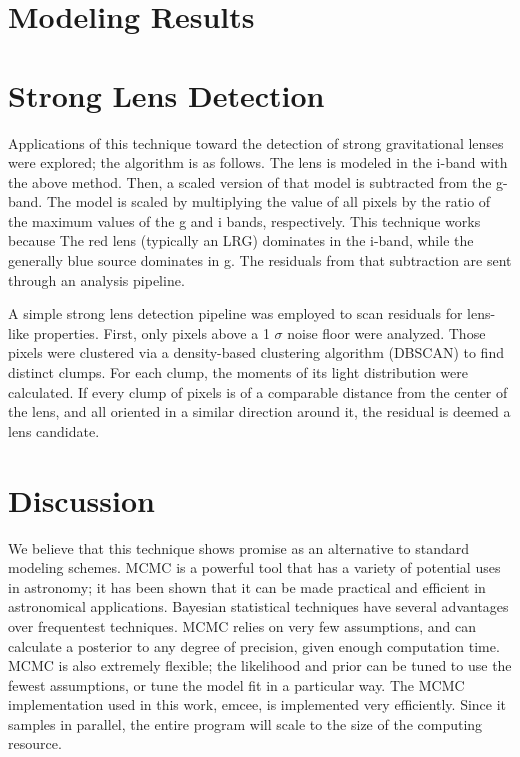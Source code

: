 \documentclass[authoryear, 12pt, 5p, times]{elsarticle}
\begin{document}
\section{Modeling Results}\label{results}

\section{Strong Lens Detection}\label{detection}
Applications of this technique toward the detection of strong gravitational lenses were explored; the algorithm is as follows. The lens is modeled in the i-band with the above method. Then, a scaled version of that model is subtracted from the g-band. The model is scaled by multiplying the value of all pixels by the ratio of the maximum values of the g and i bands, respectively. This technique works because The red lens (typically an LRG) dominates in the i-band, while the generally blue source dominates in g. The residuals from that subtraction are sent through an analysis pipeline. 

A simple strong lens detection pipeline was employed to scan residuals for lens-like properties. First, only pixels above a 1 $\sigma$ noise floor were analyzed. Those pixels were clustered via a density-based clustering algorithm (DBSCAN) to find distinct clumps. For each clump, the moments of its light distribution were calculated. If every clump of pixels is of a comparable distance from the center of the lens, and all oriented in a similar direction around it, the residual is deemed a lens candidate. 


\section{Discussion}\label{disc}
We believe that this technique shows promise as an alternative to standard modeling schemes. MCMC is a powerful tool that has a variety of potential uses in astronomy; it has been shown that it can be made practical and efficient in astronomical applications. Bayesian statistical techniques have several advantages over frequentest techniques. MCMC relies on very few assumptions, and can calculate a posterior to any degree of precision, given enough computation time. MCMC is also extremely flexible; the likelihood and prior can be tuned to use the fewest assumptions, or tune the model fit in a particular way. The MCMC implementation used in this work, emcee, is implemented very efficiently. Since it samples in parallel, the entire program will scale to the size of the computing resource. 
\end{document}

